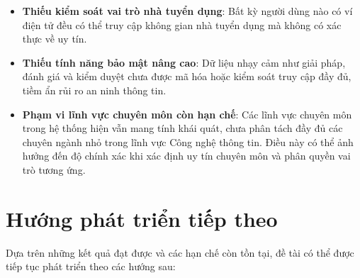 \begin{itemize}
  \item \textbf{Thiếu kiểm soát vai trò nhà tuyển dụng}: Bất kỳ người dùng nào có ví điện tử đều có thể truy cập không gian nhà tuyển dụng mà không có xác thực về uy tín.
  \item \textbf{Thiếu tính năng bảo mật nâng cao}: Dữ liệu nhạy cảm như giải pháp, đánh giá và kiểm duyệt chưa được mã hóa hoặc kiểm soát truy cập đầy đủ, tiềm ẩn rủi ro an ninh thông tin.
  \item \textbf{Phạm vi lĩnh vực chuyên môn còn hạn chế}: Các lĩnh vực chuyên môn trong hệ thống hiện vẫn mang tính khái quát, chưa phân tách đầy đủ các chuyên ngành nhỏ trong lĩnh vực Công nghệ thông tin.
        Điều này có thể ảnh hưởng đến độ chính xác khi xác định uy tín chuyên môn và phân quyền vai trò tương ứng.
\end{itemize}

\section{Hướng phát triển tiếp theo}

Dựa trên những kết quả đạt được và các hạn chế còn tồn tại, đề tài có thể được tiếp tục phát triển theo các hướng sau:

